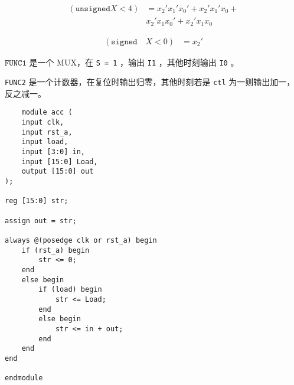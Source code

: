 \documentclass[lang=cn,11pt,a4paper,cite=authoryear,twocolumn]{elegantpaper}
\begin{document}
\[\begin{aligned}
    (\mathtt{unsigned}  X < 4) &= x_2'x_1'x_0' + x_2'x_1'x_0 + \\
     & x_2'x_1x_0' + x_2'x_1x_0
\end{aligned}\]


\[\begin{aligned}
    (\mathtt{signed }\quad X < 0) &= x_2'
\end{aligned}\]


\(\mathtt{FUNC1 }\) 是一个 MUX，在 \lstinline{S = 1} ，输出 \lstinline{I1} ，其他时刻输出 \lstinline{I0} 。

\lstinline{FUNC2} 是一个计数器，在复位时输出归零，其他时刻若是 \lstinline{ctl} 为一则输出加一，反之减一。


\begin{lstlisting}
    module acc (
    input clk,
    input rst_a,
    input load,
    input [3:0] in,
    input [15:0] Load,
    output [15:0] out
);

reg [15:0] str;

assign out = str;

always @(posedge clk or rst_a) begin
    if (rst_a) begin
        str <= 0;
    end
    else begin
        if (load) begin
            str <= Load;
        end
        else begin
            str <= in + out;
        end
    end
end
    
endmodule
\end{lstlisting}

\end{document}
